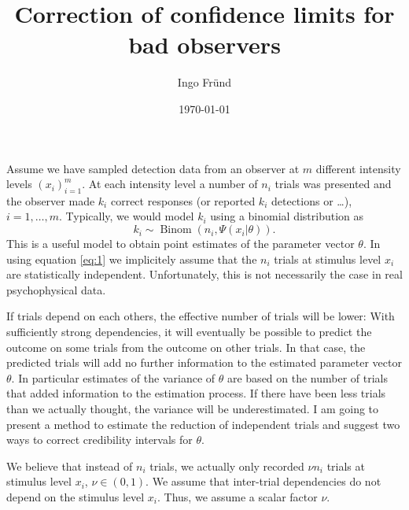 \documentclass[a4paper,11pt]{scrartcl}
\title{Correction of confidence limits for bad observers}
\author{Ingo Fründ}
\date{\today}
\def\Binomial{\operatorname{Binom}}
\begin{document}
\maketitle
Assume we have sampled detection data from an observer at $m$ different intensity levels $(x_i)_{i=1}^m$.
At each intensity level a number of $n_i$ trials was presented and the observer made $k_i$ correct responses (or reported $k_i$ detections or \dots), $i=1,\dots,m$.
Typically, we would model $k_i$ using a binomial distribution as
%
\begin{equation}
    \label{eq:1}
    k_i \sim \Binomial ( n_i, \Psi( x_i | \theta ) ).
\end{equation}
%
This is a useful model to obtain point estimates of the parameter vector $\theta$.
In using equation \eqref{eq:1} we implicitely assume that the $n_i$ trials at stimulus level $x_i$ are statistically independent.
Unfortunately, this is not necessarily the case in real psychophysical data.

If trials depend on each others, the effective number of trials will be lower:
With sufficiently strong dependencies, it will eventually be possible to predict the outcome on some trials from the outcome on other trials.
In that case, the predicted trials will add no further information to the estimated parameter vector $\theta$.
In particular estimates of the variance of $\theta$ are based on the number of trials that added information to the estimation process.
If there have been less trials than we actually thought, the variance will be underestimated.
I am going to present a method to estimate the reduction of independent trials and suggest two ways to correct credibility intervals for $\theta$.

We believe that instead of $n_i$ trials, we actually only recorded $\nu n_i$ trials at stimulus level $x_i$, $\nu\in(0,1)$.
We assume that inter-trial dependencies do not depend on the stimulus level $x_i$.
Thus, we assume a scalar factor $\nu$.
\end{document}
